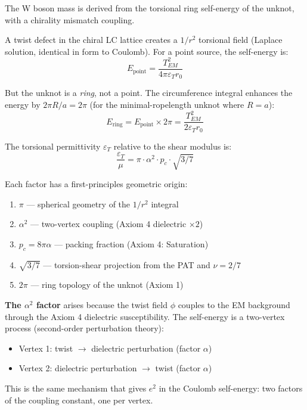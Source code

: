 The W boson mass is derived from the torsional ring self-energy of the unknot, with a chirality mismatch coupling.

A twist defect in the chiral LC lattice creates a $1/r^2$ torsional field (Laplace solution, identical in form to Coulomb). For a point source, the self-energy is:
\begin{equation}
    E_{\text{point}} = \frac{T_{EM}^2}{4\pi \varepsilon_T r_0}
\end{equation}

But the unknot is a \textit{ring}, not a point. The circumference integral enhances the energy by $2\pi R/a = 2\pi$ (for the minimal-ropelength unknot where $R = a$):
\begin{equation}
    E_{\text{ring}} = E_{\text{point}} \times 2\pi = \frac{T_{EM}^2}{2\varepsilon_T r_0}
\end{equation}

The torsional permittivity $\varepsilon_T$ relative to the shear modulus is:
\begin{equation}
    \frac{\varepsilon_T}{\mu} = \pi \cdot \alpha^2 \cdot p_c \cdot \sqrt{3/7}
\end{equation}

Each factor has a first-principles geometric origin:
\begin{enumerate}
    \item $\pi$ --- spherical geometry of the $1/r^2$ integral
    \item $\alpha^2$ --- two-vertex coupling (Axiom 4 dielectric $\times 2$)
    \item $p_c = 8\pi\alpha$ --- packing fraction (Axiom 4: Saturation)
    \item $\sqrt{3/7}$ --- torsion-shear projection from the PAT and $\nu = 2/7$
    \item $2\pi$ --- ring topology of the unknot (Axiom 1)
\end{enumerate}

\textbf{The $\alpha^2$ factor} arises because the twist field $\phi$ couples to the EM background through the Axiom 4 dielectric susceptibility. The self-energy is a two-vertex process (second-order perturbation theory):
\begin{itemize}
    \item Vertex 1: twist $\to$ dielectric perturbation (factor $\alpha$)
    \item Vertex 2: dielectric perturbation $\to$ twist (factor $\alpha$)
\end{itemize}
This is the same mechanism that gives $e^2$ in the Coulomb self-energy: two factors of the coupling constant, one per vertex.

